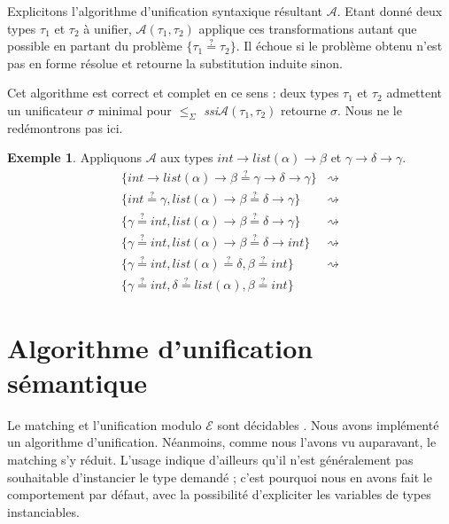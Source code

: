 \documentclass[a4paper]{report}
\theoremstyle{definition}
\newtheorem{exemple}[theoreme]{Exemple}
\newcommand{\ssi}{\textit{ssi}\xspace}
\newcommand{\E}{\mathscr E}
\newcommand{\qeq}{\stackrel {\scriptscriptstyle ?} =}
\begin{document}
Explicitons l'algorithme d'unification syntaxique résultant $\mathscr A$. Etant donné deux types $\tau_1$ et $\tau_2$ à unifier, $\mathscr A (\tau_1, \tau_2)$ applique ces transformations autant que possible en partant du problème $\{ \tau_1 \qeq \tau_2 \}$. Il échoue si le problème obtenu n'est pas en forme résolue et retourne la substitution induite sinon.

Cet algorithme est correct et complet en ce sens : deux types $\tau_1$ et $\tau_2$ admettent un unificateur $\sigma$ minimal pour $\leqslant_\Sigma$ \ssi $\mathscr A (\tau_1, \tau_2)$ retourne $\sigma$. Nous ne le redémontrons pas ici.

\begin{exemple}
	Appliquons $\mathscr A$ aux types $int \rightarrow list (\alpha) \rightarrow \beta$ et $\gamma \rightarrow \delta \rightarrow \gamma$.
	\begin{align}
			\{ int \rightarrow list (\alpha) \rightarrow \beta \qeq \gamma \rightarrow \delta \rightarrow \gamma \} &\rightsquigarrow
			\tag{decomposer-$\rightarrow$}
		\\
			\{ int \qeq \gamma, list (\alpha) \rightarrow \beta \qeq \delta \rightarrow \gamma \} &\rightsquigarrow
			\tag{orienter}
		\\
			\{ \gamma \qeq int, list (\alpha) \rightarrow \beta \qeq \delta \rightarrow \gamma \} &\rightsquigarrow
			\tag{substituer}
		\\
			\{ \gamma \qeq int, list (\alpha) \rightarrow \beta \qeq \delta \rightarrow int \} &\rightsquigarrow
			\tag{décomposer-$\rightarrow$}
		\\
			\{ \gamma \qeq int, list (\alpha) \qeq \delta, \beta \qeq int \} &\rightsquigarrow
			\tag{orienter}
		\\
			\{ \gamma \qeq int, \delta \qeq list (\alpha), \beta \qeq int \}
			\tag*{en forme résolue}
	\end{align}
\end{exemple}


\section{Algorithme d'unification sémantique}

Le matching et l'unification modulo $\E$ sont décidables \cite{Narendran_Pfenning_Statman}. Nous avons implémenté un algorithme d'unification. Néanmoins, comme nous l'avons vu auparavant, le matching s'y réduit. L'usage indique d'ailleurs qu'il n'est généralement pas souhaitable d'instancier le type demandé ; c'est pourquoi nous en avons fait le comportement par défaut, avec la possibilité d'expliciter les variables de types instanciables.
\end{document}
